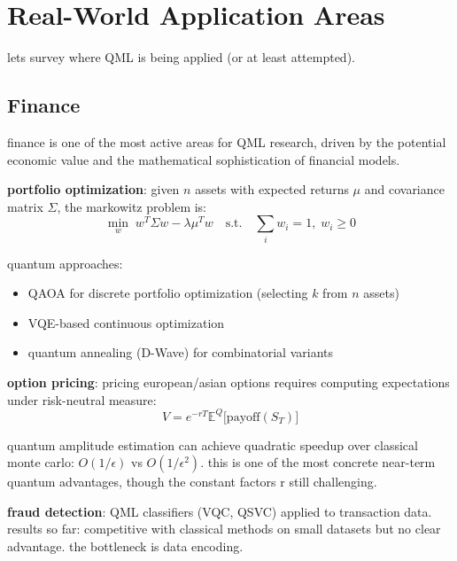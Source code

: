 \documentclass[11pt,a4paper]{article}
\theoremstyle{definition}
\theoremstyle{remark}
\begin{document}
\section{Real-World Application Areas}

lets survey where QML is being applied (or at least attempted).

\subsection{Finance}

finance is one of the most active areas for QML research, driven by the potential economic value and the mathematical sophistication of financial models.

\textbf{portfolio optimization}: given $n$ assets with expected returns $\mu$ and covariance matrix $\Sigma$, the markowitz problem is:
\begin{equation}
    \min_w \; w^T \Sigma w - \lambda \mu^T w \quad \text{s.t.} \quad \sum_i w_i = 1, \; w_i \geq 0
\end{equation}

quantum approaches:
\begin{itemize}
    \item QAOA for discrete portfolio optimization (selecting $k$ from $n$ assets)
    \item VQE-based continuous optimization
    \item quantum annealing (D-Wave) for combinatorial variants
\end{itemize}

\textbf{option pricing}: pricing european/asian options requires computing expectations under risk-neutral measure:
\begin{equation}
    V = e^{-rT} \mathbb{E}^Q\big[\text{payoff}(S_T)\big]
\end{equation}

quantum amplitude estimation can achieve quadratic speedup over classical monte carlo: $O(1/\epsilon)$ vs $O(1/\epsilon^2)$. this is one of the most concrete near-term quantum advantages, though the constant factors r still challenging.

\textbf{fraud detection}: QML classifiers (VQC, QSVC) applied to transaction data. results so far: competitive with classical methods on small datasets but no clear advantage. the bottleneck is data encoding.
\end{document}
